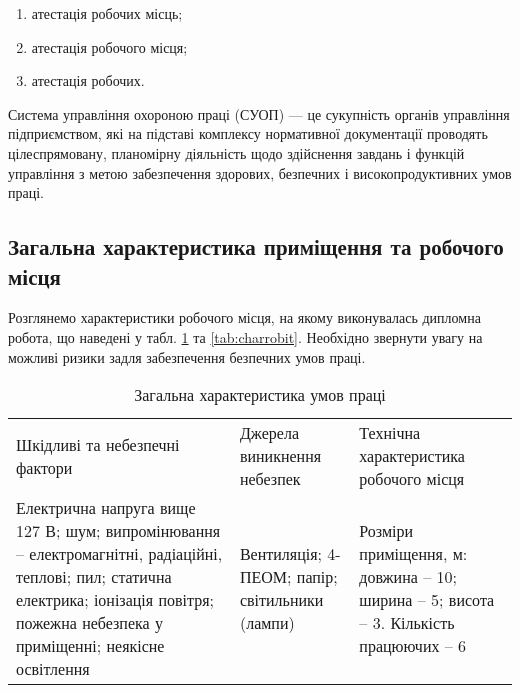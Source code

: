 \begin{enumerate}
	\item атестація робочих місць;
	\item атестація робочого місця;
	\item атестація робочих.
\end{enumerate}

Система управління охороною праці (СУОП) — це сукупність органів управління підприємством, які на підставі комплексу нормативної документації проводять цілеспрямовану, планомірну діяльність щодо здійснення завдань і функцій управління з метою забезпечення здорових, безпечних і високопродуктивних умов праці.%

\subsection{Загальна характеристика приміщення та робочого місця}

Розглянемо характеристики робочого місця, на якому виконувалась дипломна робота, що наведені у табл. \ref{tab:charumov} та \ref{tab:charrobit}. Необхідно звернути увагу на можливі ризики задля забезпечення безпечних умов праці.

\begin{table}[h]
	\captionstyle{ \raggedright}
	\caption{Загальна характеристика умов праці}\label{tab:charumov}
	\begin{tabular}{|m{}|m{}|m{}|}
		\hline
		Шкідливі та небезпечні фактори & Джерела виникнення небезпек & Технічна характеристика робочого місця \\
		\hlinewd{2pt}
		Електрична напруга вище 127 В; шум; випромінювання – електромагнітні, радіаційні, теплові; пил; статична електрика; іонізація повітря; пожежна небезпека у приміщенні; неякісне освітлення &
		Вентиляція; 4-ПЕОМ; папір; світильники (лампи) &
		Розміри приміщення, м: довжина – 10; ширина – 5; висота – 3. Кількість працюючих – 6 \\
		\hline
	\end{tabular}
\end{table}

\newpage

